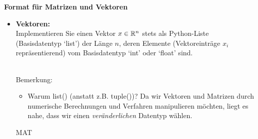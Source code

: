 \textbf{ Format für Matrizen und Vektoren}\\

\begin{itemize}
	\item \textbf{Vektoren:}\\ Implementieren Sie einen Vektor $x \in {\mathbb{R}}^{n}$ stets als Python-Liste (Basisdatentyp `list') der Länge $n$, deren Elemente (Vektoreinträge $x_i$ repräsentierend) vom Basisdatentyp `int' oder `float' sind.\\
	      {
	      ~\\
	      Bemerkung: \vspace{-0.2cm}
	      \begin{itemize}
		      \item Warum list() (anstatt z.B. tuple())? Da wir Vektoren und Matrizen durch numerische Berechnungen und Verfahren manipulieren möchten, liegt es nahe, dass wir einen \textit{veränderlichen} Datentyp wählen.
	      \end{itemize}}

	      MAT


\end{itemize}

